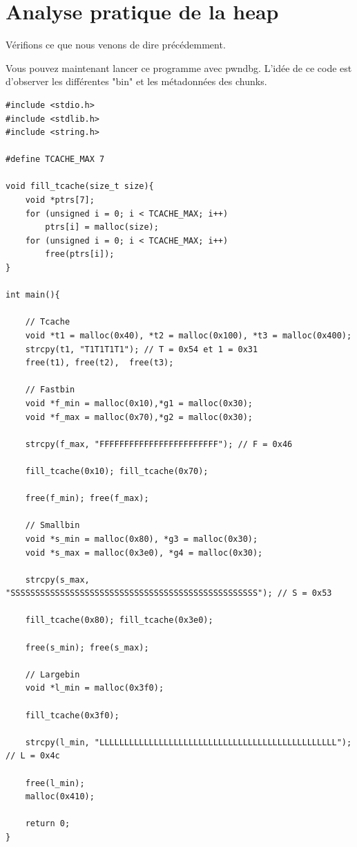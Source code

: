 \section{Analyse pratique de la heap}
\label{sec:Analyse_du_tas}

Vérifions ce que nous venons de dire précédemment.

Vous pouvez maintenant lancer ce programme avec pwndbg.
L'idée de ce code est d'observer les différentes "bin" et les métadonnées des chunks.

\begin{verbatim}
#include <stdio.h>
#include <stdlib.h>
#include <string.h>

#define TCACHE_MAX 7

void fill_tcache(size_t size){
    void *ptrs[7];
    for (unsigned i = 0; i < TCACHE_MAX; i++)
        ptrs[i] = malloc(size);
    for (unsigned i = 0; i < TCACHE_MAX; i++)
        free(ptrs[i]);
}

int main(){

    // Tcache
    void *t1 = malloc(0x40), *t2 = malloc(0x100), *t3 = malloc(0x400);
    strcpy(t1, "T1T1T1T1"); // T = 0x54 et 1 = 0x31
    free(t1), free(t2),  free(t3);

    // Fastbin
    void *f_min = malloc(0x10),*g1 = malloc(0x30);
    void *f_max = malloc(0x70),*g2 = malloc(0x30);

    strcpy(f_max, "FFFFFFFFFFFFFFFFFFFFFFFF"); // F = 0x46

    fill_tcache(0x10); fill_tcache(0x70);

    free(f_min); free(f_max);

    // Smallbin
    void *s_min = malloc(0x80), *g3 = malloc(0x30);
    void *s_max = malloc(0x3e0), *g4 = malloc(0x30);

    strcpy(s_max, "SSSSSSSSSSSSSSSSSSSSSSSSSSSSSSSSSSSSSSSSSSSSSSSSSS"); // S = 0x53

    fill_tcache(0x80); fill_tcache(0x3e0);

    free(s_min); free(s_max);

    // Largebin
    void *l_min = malloc(0x3f0);

    fill_tcache(0x3f0);

    strcpy(l_min, "LLLLLLLLLLLLLLLLLLLLLLLLLLLLLLLLLLLLLLLLLLLLLLLL"); // L = 0x4c

    free(l_min);
    malloc(0x410);

    return 0;
}


\end{verbatim}


